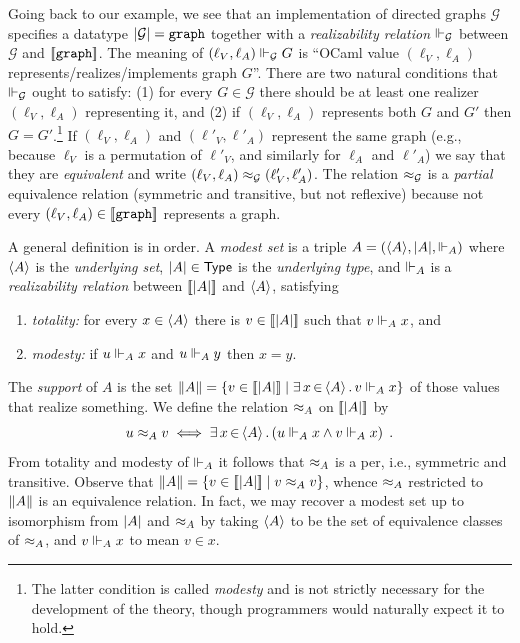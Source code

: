 Going back to our example, we see that an implementation of 
directed graphs $\mathcal{G}$ specifies a datatype
$|\mathcal{G}| = \mathtt{graph}$ together with a
\emph{realizability relation} $\Vdash_{\mathcal{G}}$ between
$\mathcal{G}$ and $[\![\mathtt{graph}]\!]$. The meaning of $(\ell_V,
\ell_A) \Vdash_\mathcal{G} G$ is ``OCaml value $(\ell_V, \ell_A)$ 
represents/realizes/implements graph $G$''. There are two natural conditions
that $\Vdash_\mathcal{G}$ ought to satisfy: (1) for every $G \in
\mathcal{G}$ there should be at least one realizer $(\ell_V, \ell_A)$
representing it, and (2) if $(\ell_V, \ell_A)$ represents both $G$ and
$G'$ then $G = G'$.\footnote{The latter condition is called \emph{modesty} and
is not strictly necessary for the development of the theory, though 
programmers would naturally expect it to hold.} If
$(\ell_V, \ell_A)$ and $(\ell'_V, \ell'_A)$ represent the same graph 
(e.g., because $\ell_V$ is a permutation of $\ell'_V$, and similarly for $\ell_A$ and $\ell'_A$)
we say that they are \emph{equivalent} and write $(\ell_V, \ell_A)
\approx_\mathcal{G} (\ell'_V, \ell'_A)$. The relation $\approx_\mathcal{G}$
is a \emph{partial} equivalence relation (symmetric and transitive,
but not reflexive) because not every $(\ell_V, \ell_A) \in
[\![\mathtt{graph}]\!]$ represents a graph.

\bigskip

A general definition is in order. A \emph{modest set} is a triple $A =
(\langle A \rangle, |A|, {\Vdash_A})$ where $\langle A \rangle$ is the
\emph{underlying set}, $|A| \in \mathsf{Type}$ is the \emph{underlying
  type}, and $\Vdash_A$ is a \emph{realizability relation} between
$[\![|A|]\!]$ and $\langle A \rangle$, satisfying
% 
\begin{enumerate}
\item \emph{totality:} for every $x \in \langle A \rangle$ there is $v \in
  [\![|A|]\!]$ such that $v \Vdash_A x$, and
\item \emph{modesty:} if $u \Vdash_A x$ and $u \Vdash_A y$ then $x = y$.
\end{enumerate}
%
The \emph{support} of $A$ is the set $\|A\| = \{v \in
  [\![|A|]\!] \mid \exists\, x \,{\in}\, \langle A \rangle\,.\,v \Vdash_A x\}$ of those
values that realize something. We define the relation $\approx_A$ on
$[\![|A|]\!]$ by
%
\begin{equation*}
  u \approx_A v
  \iff
  \exists\, x \,{\in}\, \langle A \rangle\,.\left(u \Vdash_A x \land v \Vdash_A x\right) \;.
\end{equation*}
%
From totality and modesty of $\Vdash_A$ it follows that $\approx_A$ is a per,
i.e., symmetric and transitive. Observe that $\|A\| = \{v \in
  [\![|A|]\!] \mid v \approx_A v\}$, whence $\approx_A$
restricted to $\|A\|$ is an equivalence relation. In fact, we
may recover a modest set up to isomorphism from $|A|$ and
$\approx_A$ by taking $\langle A \rangle$ to be the set of equivalence classes of
$\approx_A$, and $v \Vdash_A x$ to mean $v \in x$.

